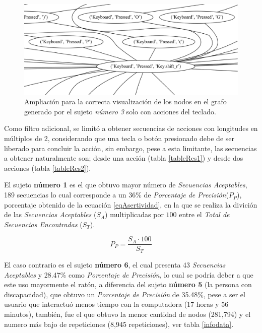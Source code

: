 \begin{figure}[h]
\centering
\includegraphics[width=1.0 \columnwidth]{chap5/Imagenes/MoreZKB150.eps}
\caption{Ampliaci\'on para la correcta visualizaci\'on de los nodos en el
 grafo generado por el sujeto \emph{n\'umero 3} solo con acciones del
 teclado.}
\label{fig:morezKB}
\end{figure}


Como filtro adicional, se limit\'o a obtener secuencias de 
 acciones con longitudes en m\'ultiplos de 2, considerando que una tecla o 
 bot\'on presionado debe de ser liberado para concluir la acci\'on, sin 
 embargo, pese a esta limitante, las secuencias a obtener naturalmente son; 
 desde una acci\'on (tabla \ref{tableRes1}) y desde dos acciones (tabla 
 \ref{tableRes2}). 
 

El sujeto \textbf{n\'umero 1} es el que obtuvo mayor n\'umero de 
 \emph{Secuencias Aceptables}, 189 secuencias lo cual corresponde a un 36\% de
 \emph{Porcentaje de Precisi\'on}($P_P$), porcentaje obtenido de la ecuaci\'on 
 \ref{eqAsertividad}, en la que se realiza la divici\'on de las \emph{Secuencias 
 Aceptables} ($S_A$) multiplicadas por $100$ entre el \emph{Total de Secuencias 
 Encontradas} ($S_T$).


\begin{equation}
P_P = \dfrac{ S_A \cdot 100}{S_T}
\label{eqAsertividad}
\end{equation}


El caso contrario es el sujeto \textbf{n\'umero 6}, el cual presenta 43 
 \emph{Secuencias Aceptables} y 28.47\% como \emph{Porcentaje de Precisi\'on}, 
 lo cual se podr\'ia deber a que este uso mayormente el rat\'on, a diferencia 
 del sujeto \textbf{n\'umero 5} (la persona con discapacidad), que obtuvo un 
 \emph{Porcentaje de Precisi\'on} de 35.48\%, pese a ser el usuario que 
 interactu\'o menos tiempo con la computadora (17 horas y 56 minutos), 
 tambi\'en, fue el que obtuvo la menor cantidad de nodos (281,794) y el numero
 m\'as bajo de repeticiones (8,945 repeticiones), ver tabla \ref{infodata}.


